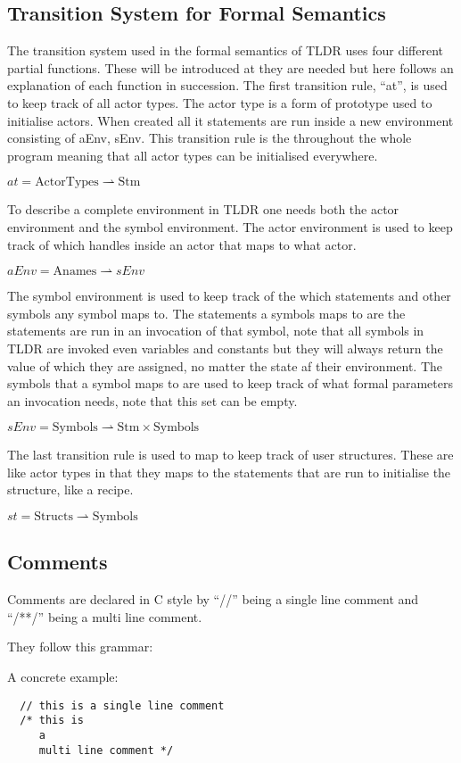 \subsection{Transition System for Formal Semantics}
The transition system used in the formal semantics of TLDR uses four different partial functions. These will be introduced at they are needed but here follows an explanation of each function in succession.
The first transition rule, \enquote{at}, is used to keep track of all actor types. The actor type is a form of prototype used to initialise actors. When created all it statements are run inside a new environment consisting of aEnv, sEnv. This transition rule is the throughout the whole program meaning that all actor types can be initialised everywhere.
\begin{center}
$at = \text{ActorTypes} \rightharpoonup \text{Stm}$
\end{center}
To describe a complete environment in TLDR one needs both the actor environment and the symbol environment. The actor environment is used to keep track of which handles inside an actor that maps to what actor.
\begin{center}
$aEnv = \text{Anames} \rightharpoonup sEnv$
\end{center}
The symbol environment is used to keep track of the which statements and other symbols any symbol maps to. The statements a symbols maps to are the statements are run in an invocation of that symbol, note that all symbols in TLDR are invoked even variables and constants but they will always return the value of which they are assigned, no matter the state af their environment. The symbols that a symbol maps to are used to keep track of what formal parameters an invocation needs, note that this set can be empty.
\begin{center}
$sEnv = \text{Symbols} \rightharpoonup \text{Stm} \times \text{Symbols}$
\end{center}
The last transition rule is used to map to keep track of user structures. These are like actor types in that they maps to the statements that are run to initialise the structure, like a recipe.
\begin{center}
$st = \text{Structs} \rightharpoonup \text{Symbols}$
\end{center}

\subsection{Comments}
\label{subsec:comments}

Comments are declared in C style by \enquote{//} being a single line comment and \enquote{/**/} being a multi line comment.

They follow this grammar:


A concrete example:

\begin{verbatim}
  // this is a single line comment
  /* this is
     a
     multi line comment */
\end{verbatim}
